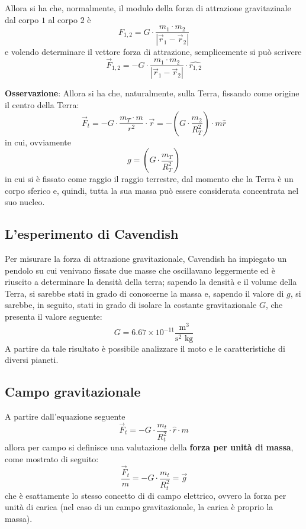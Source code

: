 \documentclass[a4paper]{extarticle}
\begin{document}
\vspace{1em}
\noindent
Allora si ha che, normalmente, il modulo della forza di attrazione gravitazinale dal corpo $1$ al corpo $2$ è
\[F_{1,2} = G \cdot \frac{m_1 \cdot m_2}{\left \vert \vec r_1 - \vec r_2 \right \vert}\]
e volendo determinare il vettore forza di attrazione, semplicemente si può scrivere
\[\vec F_{1,2} = -G \cdot \frac{m_1 \cdot m_2}{\left \vert \vec r_1 - \vec r_2 \right \vert} \cdot \hat{r_{1,2}}\]

\vspace{1em}
\noindent
\textbf{Osservazione}: Allora si ha che, naturalmente, sulla Terra, fissando come origine il centro della Terra:
\[\vec{F}_t = -G \cdot \frac{m_T \cdot m}{r^2} \cdot \vec r = - \left(G \cdot \frac{m_2}{R_T^2}\right) \cdot m \hat{r}\]
in cui, ovviamente
\[g = \left(G \cdot \frac{m_T}{R_T^2}\right)\]
in cui si è fissato come raggio il raggio terrestre, dal momento che la Terra è un corpo sferico e, quindi, tutta la sua massa può essere considerata concentrata nel suo nucleo.

\vspace{1em}
\subsection{L'esperimento di Cavendish}
Per misurare la forza di attrazione gravitazionale, Cavendish ha impiegato un pendolo su cui venivano fissate due masse che oscillavano leggermente ed è riuscito a determinare la densità della terra; sapendo la densità e il volume della Terra, si sarebbe stati in grado di conoscerne la massa e, sapendo il valore di $g$, si sarebbe, in seguito, stati in grado di isolare la costante gravitazionale $G$, che presenta il valore seguente:
\[\boxed{G = 6.67 \times 10^{-11} \frac{\text{m}^3}{\text{s}^2 \text{ kg}}}\]
A partire da tale risultato è possibile analizzare il moto e le caratteristiche di diversi pianeti.

\vspace{1em}
\subsection{Campo gravitazionale}
A partire dall'equazione seguente
\[\vec{F}_t = -G \cdot \frac{m_t}{R_t^2} \cdot \hat{r} \cdot m\]
allora per campo si definisce una valutazione della \textbf{forza per unità di massa}, come mostrato di seguito:
\[\boxed{\frac{\vec{F}_t}{m} = -G \cdot \frac{m_t}{R_t^2} = \vec g}\]
che è esattamente lo stesso concetto di di campo elettrico, ovvero la forza per unità di carica (nel caso di un campo gravitazionale, la carica è proprio la massa).
\end{document}
